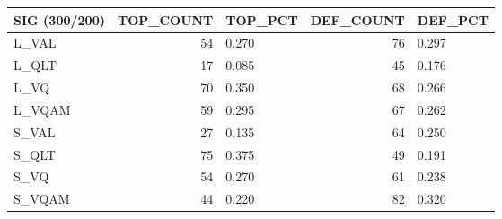 \begin{tabular}{lrlrl}
\toprule
SIG (300/200) & TOP\_COUNT & TOP\_PCT & DEF\_COUNT & DEF\_PCT \\
\midrule
L\_VAL & 54 & 0.270 & 76 & 0.297 \\
L\_QLT & 17 & 0.085 & 45 & 0.176 \\
L\_VQ & 70 & 0.350 & 68 & 0.266 \\
L\_VQAM & 59 & 0.295 & 67 & 0.262 \\
S\_VAL & 27 & 0.135 & 64 & 0.250 \\
S\_QLT & 75 & 0.375 & 49 & 0.191 \\
S\_VQ & 54 & 0.270 & 61 & 0.238 \\
S\_VQAM & 44 & 0.220 & 82 & 0.320 \\
\bottomrule
\end{tabular}
